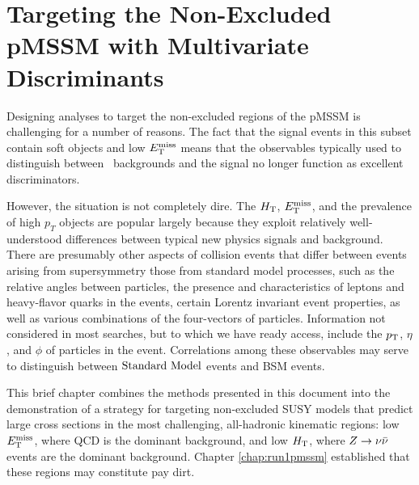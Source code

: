 \chapter{Targeting the Non-Excluded pMSSM with Multivariate Discriminants}
\label{chap:money}
\FloatBarrier

Designing analyses to target the non-excluded regions of the pMSSM is challenging for a number of reasons. The fact that the signal events in this subset contain soft objects and low $E_{\text{T}}^{\rm miss}$ means that the observables typically used to distinguish between \SM~backgrounds and the signal no longer function as excellent discriminators. 

However, the situation is not completely dire. The  $H_{\rm T}$, $E_{\text{T}}^{\rm miss}$, and the prevalence of high $p_{T}$ objects are popular largely because they exploit relatively well-understood differences between typical new physics signals and background. There are presumably other aspects of collision events that differ between events arising from supersymmetry those from standard model processes, such as the relative angles between particles, the presence and characteristics of leptons and heavy-flavor quarks in the events, certain Lorentz invariant event properties, as well as various combinations of the four-vectors of particles. Information not considered in most searches, but to which we have ready access, include the $p_{\text{T}}$, $\eta$, and $\phi$ of particles in the event. Correlations among these observables may serve to distinguish between $\text{Standard\ Model}$ events and BSM events.

This brief chapter combines the methods presented in this document into the demonstration of a strategy for targeting non-excluded SUSY models that predict large cross sections in the most challenging, all-hadronic kinematic regions: low $E_{\text{T}}^{\rm miss}$, where QCD is the dominant background, and low $H_{\rm T}$, where $Z\rightarrow \nu\bar{\nu}$ events are the dominant background. Chapter \ref{chap:run1pmssm} established that these regions may constitute pay dirt. 

